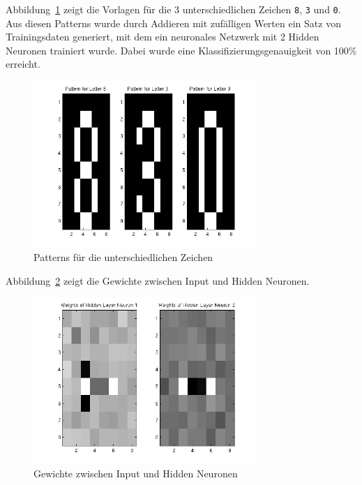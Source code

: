 Abbildung~\ref{fig:4_patterns} zeigt die Vorlagen für die 3 unterschiedlichen Zeichen \texttt{8}, \texttt{3} und \texttt{0}. Aus diesen Patterns wurde durch Addieren mit zufälligen Werten ein Satz von Trainingsdaten generiert, mit dem ein neuronales Netzwerk mit 2 Hidden Neuronen trainiert wurde. Dabei wurde eine Klassifizierungsgenauigkeit von 100\% erreicht.

\begin{figure}[h!]
  \begin{center}
    \includegraphics[width=0.75\textwidth]{./figures/4_patterns}
    \caption{Patterns für die unterschiedlichen Zeichen}
    \label{fig:4_patterns}
  \end{center}
\end{figure}

Abbildung~\ref{fig:4_weights} zeigt die Gewichte zwischen Input und Hidden Neuronen. 

\begin{figure}[h!]
  \begin{center}
    \includegraphics[width=0.75\textwidth]{./figures/4_weights}
    \caption{Gewichte zwischen Input und Hidden Neuronen}
    \label{fig:4_weights}
  \end{center}
\end{figure}

